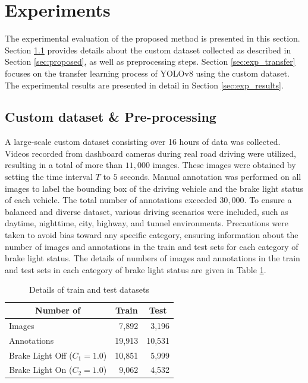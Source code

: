 \section{Experiments}
\label{sec:experiments}

The experimental evaluation of the proposed method is presented in this section. 
Section \ref{sec:exp_pre} provides details about the custom dataset collected as described in Section \ref{sec:proposed}, as well as preprocessing steps.
Section \ref{sec:exp_transfer} focuses on the transfer learning process of YOLOv8 using the custom dataset.
The experimental results are presented in detail in Section \ref{sec:exp_results}.

\subsection{Custom dataset \& Pre-processing}
\label{sec:exp_pre}
A large-scale custom dataset consisting over 16 hours of data was collected. 
Videos recorded from dashboard cameras during real road driving were utilized, resulting in a total of more than $11,000$ images.
These images were obtained by setting the time interval $T$ to $5$ seconds.
Manual annotation was performed on all images to label the bounding box of the driving vehicle and the brake light status of each vehicle.
The total number of annotations exceeded $30,000$.
To ensure a balanced and diverse dataset, various driving scenarios were included, such as daytime, nighttime, city, highway, and tunnel environments.
Precautions were taken to avoid bias toward any specific category, ensuring information about the number of images and annotations in the train and test sets for each category of brake light status.
The details of numbers of images and annotations in the train and test sets in each category of brake light status are given in Table \ref{tab:dataset}.

\begin{table}[h]
    \caption{Details of train and test datasets}
    \label{tab:dataset}
    \begin{tabular}{p{5cm} p{5cm} p{5cm}}
    \toprule
    \multicolumn{1}{c}{Number of}                          & \multicolumn{1}{c}{Train} & \multicolumn{1}{c}{Test} \\
    \midrule
    Images                              & \multicolumn{1}{r}{7,892}                     & \multicolumn{1}{r}{3,196}                    \\
    Annotations                         & \multicolumn{1}{r}{19,913}                    & \multicolumn{1}{r}{10,531}                   \\
    \multicolumn{1}{c}{Brake Light Off ($C_{1}=1.0$)} & \multicolumn{1}{r}{10,851}                    & \multicolumn{1}{r}{5,999}                    \\
    \multicolumn{1}{c}{Brake Light On ($C_{2}=1.0$)}  & \multicolumn{1}{r}{9,062}                     & \multicolumn{1}{r}{4,532}                   \\
    \bottomrule
    \end{tabular}%
\end{table}

